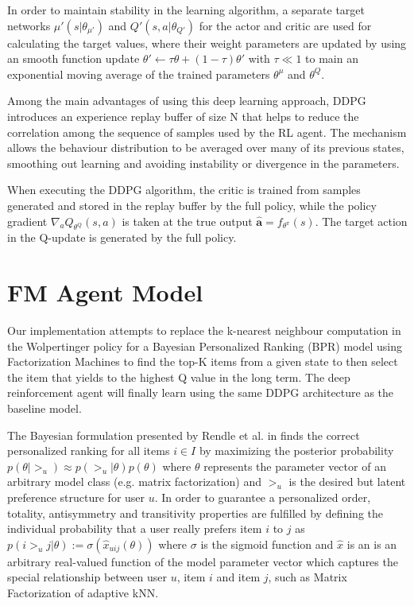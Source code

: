 In order to maintain stability in the learning algorithm, a separate target networks $\mu'(s|\theta_{\mu'})$ and $Q'(s, a|\theta_{Q'})$ for the actor and critic are used for calculating the target values, where their weight parameters are updated by using an smooth function update $\theta' \leftarrow \tau\theta + (1 - \tau)\theta'$ with $\tau \ll 1$ to main an exponential moving average of the trained parameters $\theta^{\mu}$ and $\theta^{Q}$.
 
Among the main advantages of using this deep learning approach, DDPG introduces an experience replay buffer of size N that helps to reduce the correlation among the sequence of samples used by the RL agent. The mechanism allows the behaviour distribution to be averaged over many of its previous states, smoothing out learning and avoiding instability or divergence in the parameters.

When executing the DDPG algorithm, the critic is trained from samples generated and stored in the replay buffer by the full policy, while the policy gradient $\nabla_a Q_{\theta^Q}(s,a)$ is taken at the true output $\hat{\mathbf{a}} = f_{\theta^{\pi}}(s)$. The target action in the Q-update is generated by the full policy.

\section{FM Agent Model}

Our implementation attempts to replace the k-nearest neighbour computation in the Wolpertinger policy for a Bayesian Personalized Ranking (BPR) model using Factorization Machines to find the top-K items from a given state to then select the item that yields to the highest Q value in the long term. The deep reinforcement agent will finally learn using the same DDPG architecture as the baseline model.

The Bayesian formulation presented by Rendle et al. in \cite{rendle2009bpr} finds the correct personalized ranking for all items $i \in I$ by maximizing the posterior probability $p(\theta | >_u) \approx p(>_u | \theta) p(\theta)$ where $\theta$ represents the parameter vector of an arbitrary model class (e.g. matrix factorization) and $>_u$ is the desired but latent preference structure for user $u$. In order to guarantee a personalized order, totality, antisymmetry and transitivity properties are fulfilled by defining the individual probability that a user really prefers item $i$ to $j$ as $p(i >_u j | \theta ) := \sigma(\hat{x}_{uij}(\theta))$ where $\sigma$ is the sigmoid function and $\hat{x}$ is an is  an  arbitrary  real-valued  function of the model parameter vector which captures the special relationship between user $u$, item $i$ and item $j$, such as Matrix Factorization of adaptive kNN.

